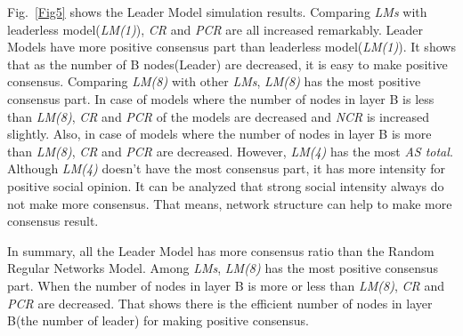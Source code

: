 \documentclass[english]{cccconf}
\begin{document}
Fig.~\ref{Fig5} shows the Leader Model simulation results. Comparing \textit{LMs} with leaderless model(\textit{LM(1)}), \textit{CR} and \textit{PCR} are all increased remarkably. Leader Models have more positive consensus part than leaderless model(\textit{LM(1)}). It shows that as the number of B nodes(Leader) are decreased, it is easy to make positive consensus. Comparing \textit{LM(8)} with other \textit{LMs}, \textit{LM(8)} has the most positive consensus part. In case of models where the number of nodes in layer B is less than \textit{LM(8)},  \textit{CR} and \textit{PCR} of the models are decreased and \textit{NCR} is increased slightly. Also, in case of models where the number of nodes in layer B is more than \textit{LM(8)}, \textit{CR} and \textit{PCR} are decreased. However, \textit{LM(4)} has the most \textit{AS total}. Although \textit{LM(4)} doesn't have the most consensus part, it has more intensity for positive social opinion. It can be analyzed that strong social intensity always do not make more consensus. That means, network structure can help to make more consensus result.    

In summary, all the Leader Model has more consensus ratio than the Random Regular Networks Model. Among \textit{LMs}, \textit{LM(8)} has the most positive consensus part. When the number of nodes in layer B is more or less than \textit{LM(8)}, \textit{CR} and \textit{PCR} are decreased. That shows there is the efficient number of nodes in layer B(the number of leader) for making positive consensus.  
\end{document}
